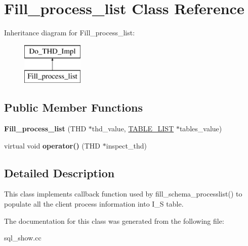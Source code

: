 \hypertarget{classFill__process__list}{}\section{Fill\+\_\+process\+\_\+list Class Reference}
\label{classFill__process__list}
Inheritance diagram for Fill\+\_\+process\+\_\+list\+:\begin{figure}[H]
\begin{center}
\leavevmode
\includegraphics[height=2.000000cm]{classFill__process__list}
\end{center}
\end{figure}
\subsection*{Public Member Functions}
\begin{DoxyCompactItemize}
\item 
\mbox{\label{classFill__process__list_aad102feddf28ddb4c85dd238b1913d67}} 
{\bfseries Fill\+\_\+process\+\_\+list} (T\+HD $\ast$thd\+\_\+value, \mbox{\hyperlink{structTABLE__LIST}{T\+A\+B\+L\+E\+\_\+\+L\+I\+ST}} $\ast$tables\+\_\+value)
\item 
\mbox{\label{classFill__process__list_a96d7cdb94e37149e4f63ff83a680d8a4}} 
virtual void {\bfseries operator()} (T\+HD $\ast$inspect\+\_\+thd)
\end{DoxyCompactItemize}


\subsection{Detailed Description}
This class implements callback function used by fill\+\_\+schema\+\_\+processlist() to populate all the client process information into I\+\_\+S table. 

The documentation for this class was generated from the following file\+:\begin{DoxyCompactItemize}
\item 
sql\+\_\+show.\+cc\end{DoxyCompactItemize}
